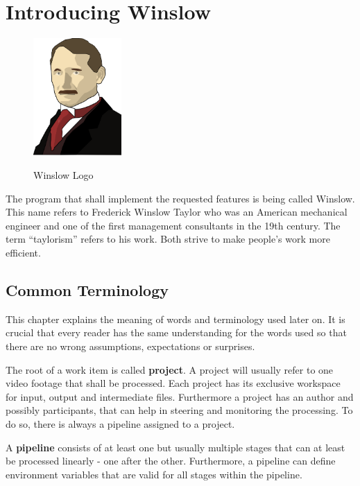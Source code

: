 

\chapter{Introducing Winslow}

\begin{figure}
	\centering
	\vspace{-1.5cm}
	\includegraphics[width=0.3\textwidth]{winslow_friendly_flipped.png}
	\label{winslow:icon}
	\caption{Winslow Logo}
\end{figure}


The program that shall implement the requested features is being called Winslow.
This name refers to Frederick Winslow Taylor who was an American mechanical engineer and one of the first management consultants in the 19th century\cite{brit:winslow}\cite{wiki:winslow}.
The term \enquote{taylorism} refers to his work\cite{brit:taylorism}.
Both strive to make people's work more efficient.


\section{Common Terminology}
\label{winslow:terminology}

This chapter explains the meaning of words and terminology used later on.
It is crucial that every reader has the same understanding for the words used so that there are no wrong assumptions, expectations or surprises.

The root of a work item is called \textbf{project}.
A project will usually refer to one video footage that shall be processed.
Each project has its exclusive workspace for input, output and intermediate files.
Furthermore a project has an author and possibly participants, that can help in steering and monitoring the processing.
To do so, there is always a pipeline assigned to a project.

A \textbf{pipeline} consists of at least one but usually multiple stages that can at least be processed linearly - one after the other.
Furthermore, a pipeline can define environment variables that are valid for all stages within the pipeline.

